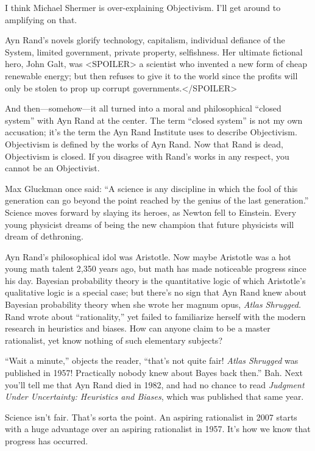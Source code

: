 {
 I think Michael Shermer is over-explaining Objectivism.
I'll get around to amplifying on that.}

{
 Ayn Rand's novels glorify technology, capitalism,
individual defiance of the System, limited government, private
property, selfishness. Her ultimate fictional hero, John Galt, was
{\textless}SPOILER{\textgreater} a scientist who invented a new form of
cheap renewable energy; but then refuses to give it to the world since
the profits will only be stolen to prop up corrupt
governments.{\textless}/SPOILER{\textgreater}}

{
 And then---somehow---it all turned into a moral and philosophical
``closed system'' with Ayn Rand at
the center. The term ``closed
system'' is not my own accusation;
it's the term the Ayn Rand Institute uses to describe
Objectivism. Objectivism is defined by the works of Ayn Rand. Now that
Rand is dead, Objectivism is closed. If you disagree with
Rand's works in any respect, you cannot be an
Objectivist.}

{
 Max Gluckman once said: ``A science is any
discipline in which the fool of this generation can go beyond the point
reached by the genius of the last generation.''
Science moves forward by slaying its heroes, as Newton fell to
Einstein. Every young physicist dreams of being the new champion that
future physicists will dream of dethroning.}

{
 Ayn Rand's philosophical idol was Aristotle. Now
maybe Aristotle was a hot young math talent 2,350 years ago, but math
has made noticeable progress since his day. Bayesian probability theory
is the quantitative logic of which Aristotle's
qualitative logic is a special case; but there's no
sign that Ayn Rand knew about Bayesian probability theory when she
wrote her magnum opus, \textit{Atlas Shrugged.} Rand wrote about
``rationality,'' yet failed to
familiarize herself with the modern research in heuristics and biases.
How can anyone claim to be a master rationalist, yet know nothing of
such elementary subjects?}

{
 ``Wait a minute,'' objects the
reader, ``that's not quite fair!
\textit{Atlas Shrugged} was published in 1957! Practically nobody knew
about Bayes back then.'' Bah. Next
you'll tell me that Ayn Rand died in 1982, and had no
chance to read \textit{Judgment Under Uncertainty: Heuristics and
Biases}, which was published that same year.}

{
 Science isn't fair. That's sorta
the point. An aspiring rationalist in 2007 starts with a huge advantage
over an aspiring rationalist in 1957. It's how we know
that progress has occurred.}

